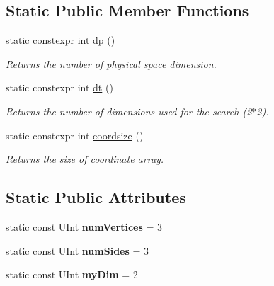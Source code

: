 \subsection*{Static Public Member Functions}
\begin{DoxyCompactItemize}
\item 
\hypertarget{classTriangle_acf8960ec24710c9ec36de3b0d215e607}{
static constexpr int \hyperlink{classTriangle_acf8960ec24710c9ec36de3b0d215e607}{dp} ()}
\label{classTriangle_acf8960ec24710c9ec36de3b0d215e607}

\begin{DoxyCompactList}\small\item\em Returns the number of physical space dimension. \item\end{DoxyCompactList}\item 
\hypertarget{classTriangle_a13e45a6ea1f8d08dfe11f731b8625971}{
static constexpr int \hyperlink{classTriangle_a13e45a6ea1f8d08dfe11f731b8625971}{dt} ()}
\label{classTriangle_a13e45a6ea1f8d08dfe11f731b8625971}

\begin{DoxyCompactList}\small\item\em Returns the number of dimensions used for the search (2$\ast$2). \item\end{DoxyCompactList}\item 
\hypertarget{classTriangle_a3b983936120f9167a549fc2044a04adb}{
static constexpr int \hyperlink{classTriangle_a3b983936120f9167a549fc2044a04adb}{coordsize} ()}
\label{classTriangle_a3b983936120f9167a549fc2044a04adb}

\begin{DoxyCompactList}\small\item\em Returns the size of coordinate array. \item\end{DoxyCompactList}\end{DoxyCompactItemize}
\subsection*{Static Public Attributes}
\begin{DoxyCompactItemize}
\item 
\hypertarget{classTriangle_a235d77391422024ac15a53155d957116}{
static const UInt {\bfseries numVertices} = 3}
\label{classTriangle_a235d77391422024ac15a53155d957116}

\item 
\hypertarget{classTriangle_a3da7e9001c7ecf58fd02c237a31df732}{
static const UInt {\bfseries numSides} = 3}
\label{classTriangle_a3da7e9001c7ecf58fd02c237a31df732}

\item 
\hypertarget{classTriangle_a09b9dea67585d95f1e4b573922a9f79d}{
static const UInt {\bfseries myDim} = 2}
\label{classTriangle_a09b9dea67585d95f1e4b573922a9f79d}

\end{DoxyCompactItemize}



